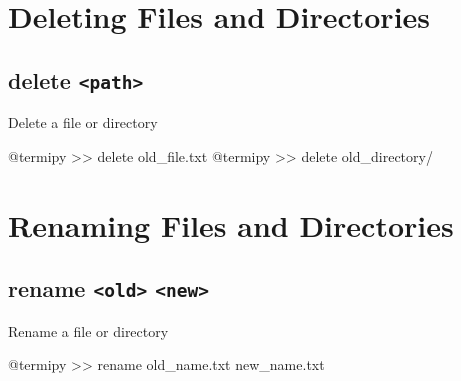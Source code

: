 \documentclass[
  letterpaper,
  DIV=11,
  numbers=noendperiod]{scrreprt}
\newenvironment{Shaded}{\begin{snugshade}}{\end{snugshade}}
\newcommand{\ExtensionTok}[1]{\textcolor[rgb]{0.00,0.23,0.31}{#1}}
\newcommand{\NormalTok}[1]{\textcolor[rgb]{0.00,0.23,0.31}{#1}}
\newcommand{\OperatorTok}[1]{\textcolor[rgb]{0.37,0.37,0.37}{#1}}
\begin{document}
\section*{Deleting Files and
Directories}\label{deleting-files-and-directories}


\subsection*{\texorpdfstring{delete
\texttt{\textless{}path\textgreater{}}}{delete \textless path\textgreater{}}}\label{delete-path}

Delete a file or directory

\begin{Shaded}
\begin{Highlighting}[]
\ExtensionTok{@termipy} \OperatorTok{\textgreater{}\textgreater{}}\NormalTok{ delete old\_file.txt}
\ExtensionTok{@termipy} \OperatorTok{\textgreater{}\textgreater{}}\NormalTok{ delete old\_directory/}
\end{Highlighting}
\end{Shaded}

\section*{Renaming Files and
Directories}\label{renaming-files-and-directories}


\subsection*{\texorpdfstring{rename
\texttt{\textless{}old\textgreater{}}
\texttt{\textless{}new\textgreater{}}}{rename \textless old\textgreater{} \textless new\textgreater{}}}\label{rename-old-new}

Rename a file or directory

\begin{Shaded}
\begin{Highlighting}[]
\ExtensionTok{@termipy} \OperatorTok{\textgreater{}\textgreater{}}\NormalTok{ rename old\_name.txt new\_name.txt}
\end{Highlighting}
\end{Shaded}
\end{document}
